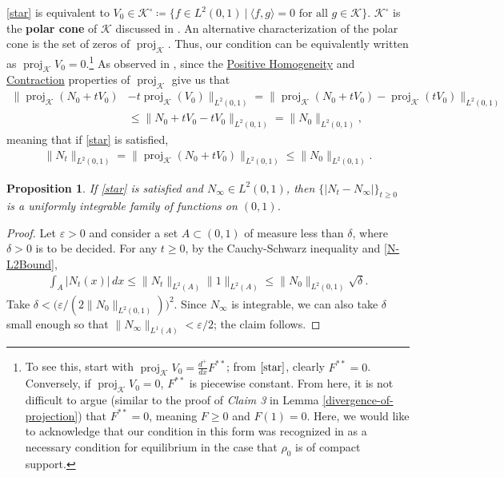 \documentclass[10pt,a4paper]{amsart}
\newtheorem{prop}[thm]{Proposition}
\numberwithin{equation}{section}
\DeclareMathOperator{\proj}{proj}
\begin{document}
    \eqref{star} is equivalent to $V_0\in\mathcal{K}^\circ\coloneq\big\{f\in L^2(0,1) \ \big| \ \langle f,g\rangle=0 \text{ for all } g\in\mathcal{K}\}$. $\mathcal{K}^\circ$ is the \textbf{polar cone} of $\mathcal{K}$ discussed in \cite{Natile-Savare}. An alternative characterization of the polar cone is the set of zeros of $\proj_{\mathcal{K}}$. Thus, our condition can be equivalently written as $\proj_{\mathcal{K}}V_0=0$.\footnote{To see this, start with $\proj_\mathcal{K}V_0=\frac{d^+}{dx}F^{**}$; from $\eqref{star}$, clearly $F^{**}=0$. Conversely, if $\proj_\mathcal{K}V_0=0$, $F^{**}$ is piecewise constant. From here, it is not difficult to argue (similar to the proof of \textit{Claim 3} in Lemma \ref{divergence-of-projection}) that $F^{**}=0$, meaning $F\geq0$ and $F(1)=0$. Here, we would like to acknowledge that our condition in this form was recognized in \cite{Hynd-Tudorascu} as a necessary condition for equilibrium in the case that $\rho_0$ is of compact support.} As observed in \cite{Hynd-Tudorascu}, since the \hyperlink{PositiveHomogeneity}{Positive Homogeneity} and \hyperlink{Contraction}{Contraction} properties of $\proj_\mathcal{K}$ give us that 
    \begin{align*}
        \|\proj_\mathcal{K}(N_0+tV_0)&-t\proj_\mathcal{K}(V_0)\|_{L^2(0,1)}=\|\proj_\mathcal{K}(N_0+tV_0)-\proj_\mathcal{K}(tV_0)\|_{L^2(0,1)}
        \\
        &\leq\|N_0+tV_0-tV_0\|_{L^2(0,1)}=\|N_0\|_{L^2(0,1)}, 
    \end{align*}
    meaning that if \eqref{star} is satisfied, 
    \begin{align}\label{N-L2Bound}
        \|N_t\|_{L^2(0,1)}=\|\proj_\mathcal{K}(N_0+tV_0)\|_{L^2(0,1)}\leq\|N_0\|_{L^2(0,1)}. 
    \end{align}
    \begin{prop}\label{uniform-integrable}
        If \eqref{star} is satisfied and $N_\infty\in L^2(0,1)$, then $\{|N_t-N_\infty|\}_{t\geq0}$ is a uniformly integrable family of functions on $(0,1)$. 
    \end{prop}
    \begin{proof}
        Let $\varepsilon>0$ and consider a set $A\subset(0,1)$ of measure less than $\delta$, where $\delta>0$ is to be decided. For any $t\geq0$, by the Cauchy-Schwarz inequality and \eqref{N-L2Bound},
        \begin{align*}
            \int_A|N_t(x)|\, dx\leq\|N_t\|_{L^2(A)}\|1\|_{L^2(A)}\leq\|N_0\|_{L^2(0,1)}\sqrt{\delta}. 
        \end{align*}
        Take $\delta<\big(\varepsilon/(2\|N_0\|_{L^2(0,1)})\big)^2$. Since $N_\infty$ is integrable, we can also take $\delta$ small enough so that $\|N_\infty\|_{L^1(A)}<\varepsilon/2$; the claim follows. 
    \end{proof}
\end{document}
